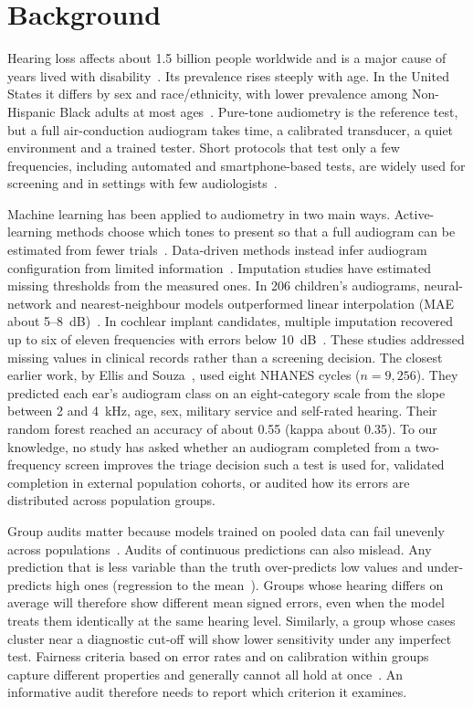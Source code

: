 \documentclass[11pt]{article}
\begin{document}
\section*{Background}

Hearing loss affects about 1.5 billion people worldwide and is a major cause of years lived with disability~\cite{who2021,chadha2021,wilson2017}. Its prevalence rises steeply with age. In the United States it differs by sex and race/ethnicity, with lower prevalence among Non-Hispanic Black adults at most ages~\cite{agrawal2008,lin2011prev,lin2011older,goman2016,hoffman2017}. Pure-tone audiometry is the reference test, but a full air-conduction audiogram takes time, a calibrated transducer, a quiet environment and a trained tester. Short protocols that test only a few frequencies, including automated and smartphone-based tests, are widely used for screening and in settings with few audiologists~\cite{swanepoel2014,sandstrom2016,mahomed2013}.

Machine learning has been applied to audiometry in two main ways. Active-learning methods choose which tones to present so that a full audiogram can be estimated from fewer trials~\cite{song2015,schlittenlacher2018,barbour2019}. Data-driven methods instead infer audiogram configuration from limited information~\cite{charih2020,wasmann2021}. Imputation studies have estimated missing thresholds from the measured ones. In 206 children's audiograms, neural-network and nearest-neighbour models outperformed linear interpolation (MAE about 5--8~dB)~\cite{pitathawatchai2022}. In cochlear implant candidates, multiple imputation recovered up to six of eleven frequencies with errors below 10~dB~\cite{pavelchek2023}. These studies addressed missing values in clinical records rather than a screening decision. The closest earlier work, by Ellis and Souza~\cite{ellis2021}, used eight NHANES cycles ($n=9{,}256$). They predicted each ear's audiogram class on an eight-category scale from the slope between 2 and 4~kHz, age, sex, military service and self-rated hearing. Their random forest reached an accuracy of about 0.55 (kappa about 0.35). To our knowledge, no study has asked whether an audiogram completed from a two-frequency screen improves the triage decision such a test is used for, validated completion in external population cohorts, or audited how its errors are distributed across population groups.

Group audits matter because models trained on pooled data can fail unevenly across populations~\cite{obermeyer2019,seyyed2021,rajkomar2018}. Audits of continuous predictions can also mislead. Any prediction that is less variable than the truth over-predicts low values and under-predicts high ones (regression to the mean~\cite{barnett2005}). Groups whose hearing differs on average will therefore show different mean signed errors, even when the model treats them identically at the same hearing level. Similarly, a group whose cases cluster near a diagnostic cut-off will show lower sensitivity under any imperfect test. Fairness criteria based on error rates and on calibration within groups capture different properties and generally cannot all hold at once~\cite{kleinberg2017,chouldechova2017}. An informative audit therefore needs to report which criterion it examines.
\end{document}
